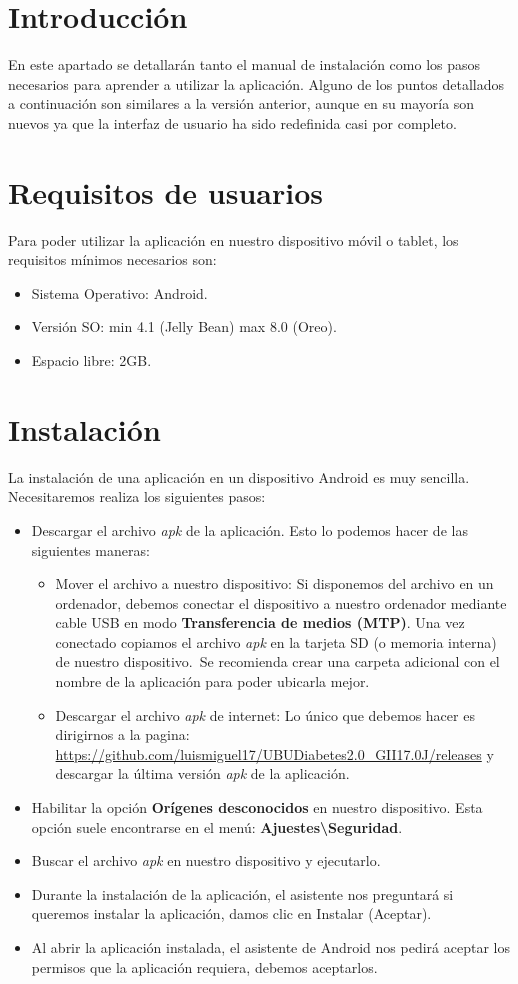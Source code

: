 
\section{Introducción}
En este apartado se detallarán tanto el manual de instalación como los pasos necesarios para
aprender a utilizar la aplicación.
Alguno de los puntos detallados a continuación son similares a la versión anterior, aunque en su mayoría son nuevos ya que la interfaz de usuario ha sido redefinida casi por completo.

\section{Requisitos de usuarios}
Para poder utilizar la aplicación en nuestro dispositivo móvil o tablet, los requisitos mínimos necesarios son:
\begin{itemize}
	\item Sistema Operativo: Android.
	\item Versión SO: min 4.1 (Jelly Bean) max 8.0 (Oreo).
	\item Espacio libre: 2GB.
\end{itemize}
\section{Instalación}
La instalación de una aplicación en un dispositivo Android es muy sencilla. Necesitaremos realiza los siguientes pasos:
\begin{itemize}
	\item Descargar el archivo \textit{apk} de la aplicación. Esto lo podemos hacer de las siguientes maneras:
	\begin{itemize}
		\item Mover el archivo a nuestro dispositivo: Si disponemos del archivo en un ordenador, debemos conectar el dispositivo a nuestro ordenador mediante cable USB en modo \textbf{Transferencia de medios (MTP)}. Una vez conectado copiamos el archivo \textit{apk} en la tarjeta SD (o memoria interna) de nuestro dispositivo.\ Se recomienda crear una carpeta adicional con el nombre de la aplicación para poder ubicarla mejor.
		\item Descargar el archivo \textit{apk} de internet: Lo único que debemos hacer es dirigirnos a la pagina: \url{https://github.com/luismiguel17/UBUDiabetes2.0_GII17.0J/releases} y descargar la última versión \textit{apk} de la aplicación.
	\end{itemize}
	\item Habilitar la opción \textbf{Orígenes desconocidos} en nuestro dispositivo. Esta opción suele encontrarse en el menú: \textbf{Ajuestes\textbackslash{Seguridad}}.
	\item Buscar el archivo \textit{apk} en nuestro dispositivo y ejecutarlo.
	\item Durante la instalación de la aplicación, el asistente nos preguntará si queremos instalar la aplicación, damos clic en Instalar (Aceptar).
	\item Al abrir la aplicación instalada, el asistente de Android nos pedirá aceptar los permisos que la aplicación requiera, debemos aceptarlos.
\end{itemize}
